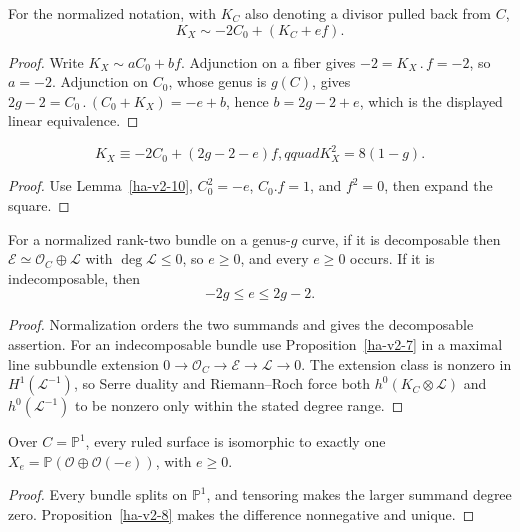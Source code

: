 \begin{lemma}
\label{ha-v2-10}
For the normalized notation, with \(K_C\) also denoting a divisor pulled back
from \(C\),
\[
 K_X\sim -2C_0+(K_C+ef).
\]

\end{lemma}
\begin{proof}
Write \(K_X\sim aC_0+bf\).  Adjunction on a fiber gives
\(-2=K_X\mathbin{.}f=-2\), so \(a=-2\).  Adjunction on \(C_0\), whose genus
is \(g(C)\), gives \(2g-2=C_0\mathbin{.}(C_0+K_X)=-e+b\), hence
\(b=2g-2+e\), which is the displayed
linear equivalence.
\end{proof}

\begin{corollary}
\label{ha-v2-11}
\[
 K_X\equiv-2C_0+(2g-2-e)f,qquad K_X^2=8(1-g).
\]
\end{corollary}
\begin{proof}
Use Lemma~\ref{ha-v2-10}, \(C_0^2=-e\), \(C_0.f=1\), and \(f^2=0\), then
expand the square.
\end{proof}

\begin{theorem}
\label{ha-v2-12}
For a normalized rank-two bundle on a genus-\(g\) curve, if it is decomposable
then \(\mathcal E\simeq\mathcal O_C\oplus\mathcal L\) with \(\deg\mathcal L\le0\),
so \(e\ge0\), and every \(e\ge0\) occurs.  If it is indecomposable, then
\[
 -2g\le e\le2g-2.
\]
\end{theorem}
\begin{proof}
Normalization orders the two summands and gives the decomposable assertion.
For an indecomposable bundle use Proposition~\ref{ha-v2-7} in a maximal line
subbundle extension \(0\to\mathcal O_C\to\mathcal E\to\mathcal L\to0\).
The extension class is nonzero in \(H^1(\mathcal L^{-1})\), so Serre duality
and Riemann--Roch force both \(h^0(K_C\otimes\mathcal L)\) and
\(h^0(\mathcal L^{-1})\) to be nonzero only within the stated degree range.
\end{proof}

\begin{corollary}
\label{ha-v2-13}
Over \(C=\mathbb P^1\), every ruled surface is isomorphic to exactly one
\(X_e=\mathbb P(\mathcal O\oplus\mathcal O(-e))\), with \(e\ge0\).
\end{corollary}
\begin{proof}
Every bundle splits on \(\mathbb P^1\), and tensoring makes the larger summand
degree zero.  Proposition~\ref{ha-v2-8} makes the difference nonnegative and
unique.
\end{proof}

